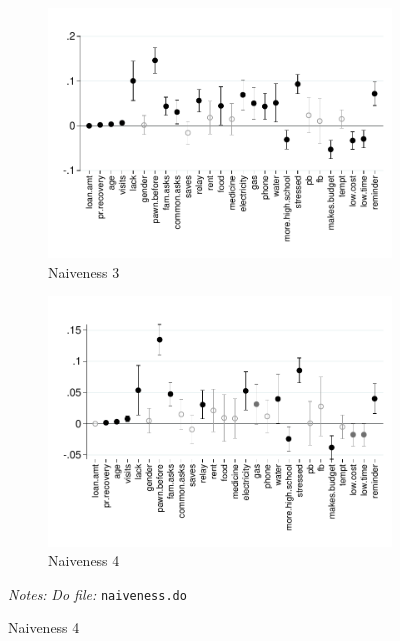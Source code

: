 \documentclass[11pt]{article}
\begin{document}
\begin{figure}[H]
\begin{center}
\begin{subfigure}{0.45\textwidth}
        \caption{Naiveness 3}
        \centering
        \includegraphics[width=\textwidth]{Figuras/det_naiveness_pos_pay_default.pdf}
    \end{subfigure}
    \begin{subfigure}{0.45\textwidth}
        \caption{Naiveness 4}
        \centering
        \includegraphics[width=\textwidth]{Figuras/det_naiveness_pay_30_default.pdf}
    \end{subfigure}
    \end{center}
     \footnotesize \textit{Notes: } 
      \footnotesize{ \textit{Do file: }  \texttt{naiveness.do}}
\end{figure}
\end{document}
